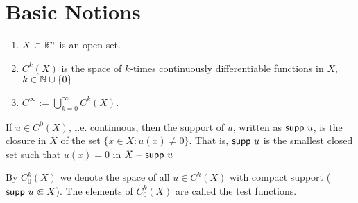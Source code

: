 \section{Basic Notions}
\begin{definition}
    \begin{enumerate}
        \item $X \in \mathbb{R}^n$ is an open set.
        \item $C^k(X)$ is the space of $k$-times continuously differentiable functions in $X$, $k \in \mathbb{N} \cup \{0\}$
        \item $C^{\infty} := \bigcup_{k = 0}^{\infty} C^k(X)$.
    \end{enumerate}
\end{definition}

\begin{definition}
    If $u \in C^{0}(X)$, i.e. continuous, then the support of $u$, written as $\mathsf{supp~} u$, is the closure in $X$ of the set $\{ x \in X: u(x) \neq 0 \}$. That is, $\mathsf{supp~} u$ is the smallest closed set such that $u(x) = 0$ in $X - \mathsf{supp~} u$
\end{definition}

\begin{definition}
    By $C^k_0(X)$ we denote the space of all $u \in C^k(X)$ with compact support ($\mathsf{supp~} u \Subset X$). The elements of $C^k_0(X)$ are called the test functions.
\end{definition}

\begin{lemma}
\end{lemma}